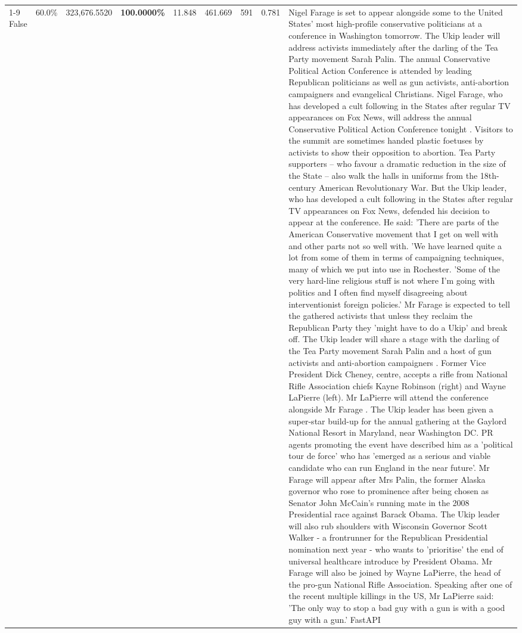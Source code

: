 \begin{table}[H]
\begin{tabular}{lllrlllll}
\cline{1-9}
False & 60.0\% & 323,676.5520 & \bfseries \color{red} 100.0000\% & 11.848 & 461.669 & 591 & 0.781 & Nigel Farage is set to appear alongside some to the United States' most high-profile conservative politicians at a conference in Washington tomorrow. The Ukip leader will address activists immediately after the darling of the Tea Party movement Sarah Palin. The annual Conservative Political Action Conference is attended by leading Republican politicians as well as gun activists, anti-abortion campaigners and evangelical Christians. Nigel Farage, who has developed a cult following in the States after regular TV appearances on Fox News, will address the annual Conservative Political Action Conference tonight . Visitors to the summit are sometimes handed plastic foetuses by activists to show their opposition to abortion. Tea Party supporters – who favour a dramatic reduction in the size of the State – also walk the halls in uniforms from the 18th-century American Revolutionary War. But the Ukip leader, who has developed a cult following in the States after regular TV appearances on Fox News, defended his decision to appear at the conference. He said: 'There are parts of the American Conservative movement that I get on well with and other parts not so well with. 'We have learned quite a lot from some of them in terms of campaigning techniques, many of which we put into use in Rochester. 'Some of the very hard-line religious stuff is not where I'm going with politics and I often find myself disagreeing about interventionist foreign policies.' Mr Farage is expected to tell the gathered activists that unless they reclaim the Republican Party they 'might have to do a Ukip' and break off. The Ukip leader will share a stage with the darling of the Tea Party movement Sarah Palin and a host of gun activists and anti-abortion campaigners . Former Vice President Dick Cheney, centre, accepts a rifle from National Rifle Association chiefs Kayne Robinson (right) and Wayne LaPierre (left). Mr LaPierre will attend the conference alongside Mr Farage . The Ukip leader has been given a super-star build-up for the annual gathering at the Gaylord National Resort in Maryland, near Washington DC. PR agents promoting the event have described him as a 'political tour de force' who has 'emerged as a serious and viable candidate who can run England in the near future'. Mr Farage will appear after Mrs Palin, the former Alaska governor who rose to prominence after being chosen as Senator John McCain's running mate in the 2008 Presidential race against Barack Obama. The Ukip leader will also rub shoulders with Wisconsin Governor Scott Walker - a frontrunner for the Republican Presidential nomination next year - who wants to 'prioritise' the end of universal healthcare introduce by President Obama. Mr Farage will also be joined by Wayne LaPierre, the head of the pro-gun National Rifle Association. Speaking after one of the recent multiple killings in the US, Mr LaPierre said: 'The only way to stop a bad guy with a gun is with a good guy with a gun.' FastAPI \\

\end{tabular}
\end{table}
